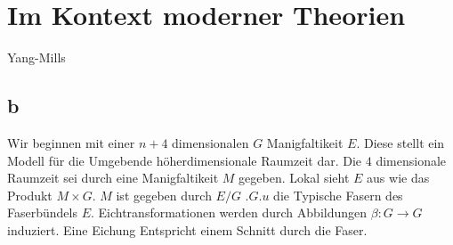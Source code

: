 \chapter{Im Kontext moderner Theorien}
Yang-Mills
% 
% 
\section{b}
Wir beginnen mit einer $n+4$ dimensionalen $G$ Manigfaltikeit $E$. 
Diese stellt ein Modell für die Umgebende höherdimensionale Raumzeit dar. Die
$4$ dimensionale Raumzeit sei durch eine Manigfaltikeit $M$ gegeben. Lokal sieht
$E$ aus wie das Produkt $M\times G$. $M$ ist gegeben durch $E/G$ .$G.u$  die
Typische Fasern des Faserbündels $E$. Eichtransformationen werden durch
Abbildungen $\beta:G\to G$ induziert. Eine Eichung Entspricht einem Schnitt durch die Faser.
